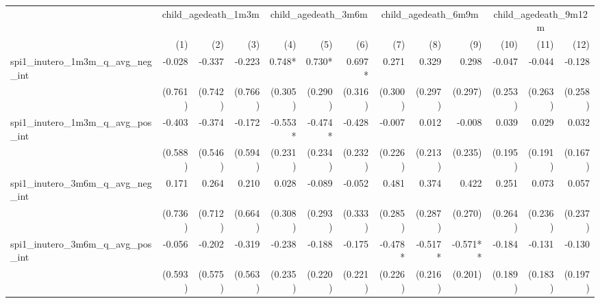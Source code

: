 \begin{tabular}{lrrrrrrrrrrrr}
\toprule
                                            &  \multicolumn{3}{c}{child\_agedeath\_1m3m} &  \multicolumn{3}{c}{child\_agedeath\_3m6m} &  \multicolumn{3}{c}{child\_agedeath\_6m9m} & \multicolumn{3}{c}{child\_agedeath\_9m12m} \\ 
\cmidrule(lr){2-4} \cmidrule(lr){5-7} \cmidrule(lr){8-10} \cmidrule(lr){11-13} 
                                            &          (1) &          (2) &          (3) &          (4) &          (5) &          (6) &          (7) &          (8) &          (9) &         (10) &         (11) &         (12) \\ 
\midrule
spi1\_inutero\_1m3m\_q\_avg\_neg\_int       &       -0.028 &       -0.337 &       -0.223 &       0.748* &       0.730* &       0.697* &        0.271 &        0.329 &        0.298 &       -0.047 &       -0.044 &       -0.128 \\ 
                                            &      (0.761) &      (0.742) &      (0.766) &      (0.305) &      (0.290) &      (0.316) &      (0.300) &      (0.297) &      (0.297) &      (0.253) &      (0.263) &      (0.258) \\ 
spi1\_inutero\_1m3m\_q\_avg\_pos\_int       &       -0.403 &       -0.374 &       -0.172 &      -0.553* &      -0.474* &       -0.428 &       -0.007 &        0.012 &       -0.008 &        0.039 &        0.029 &        0.032 \\ 
                                            &      (0.588) &      (0.546) &      (0.594) &      (0.231) &      (0.234) &      (0.232) &      (0.226) &      (0.213) &      (0.235) &      (0.195) &      (0.191) &      (0.167) \\ 
spi1\_inutero\_3m6m\_q\_avg\_neg\_int       &        0.171 &        0.264 &        0.210 &        0.028 &       -0.089 &       -0.052 &        0.481 &        0.374 &        0.422 &        0.251 &        0.073 &        0.057 \\ 
                                            &      (0.736) &      (0.712) &      (0.664) &      (0.308) &      (0.293) &      (0.333) &      (0.285) &      (0.287) &      (0.270) &      (0.264) &      (0.236) &      (0.237) \\ 
spi1\_inutero\_3m6m\_q\_avg\_pos\_int       &       -0.056 &       -0.202 &       -0.319 &       -0.238 &       -0.188 &       -0.175 &      -0.478* &      -0.517* &     -0.571** &       -0.184 &       -0.131 &       -0.130 \\ 
                                            &      (0.593) &      (0.575) &      (0.563) &      (0.235) &      (0.220) &      (0.221) &      (0.226) &      (0.216) &      (0.201) &      (0.189) &      (0.183) &      (0.197) \\ 

\end{tabular}
